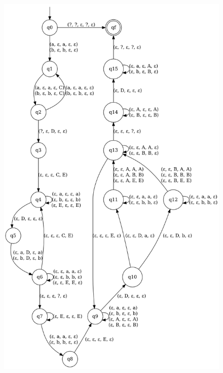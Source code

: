\documentclass[a4paper]{article}
\begin{document}
\begin{figure}[h!]
  \centering
  \includegraphics[scale=0.55]{ww_pilhas.png}
\end{figure}
\end{document}
